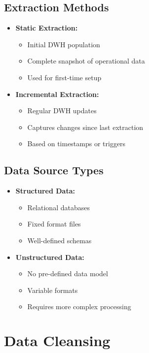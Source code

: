 \subsection{Extraction Methods}
\begin{itemize}
    \item \textbf{Static Extraction:}
        \begin{itemize}
            \item Initial DWH population
            \item Complete snapshot of operational data
            \item Used for first-time setup
        \end{itemize}
    \item \textbf{Incremental Extraction:}
        \begin{itemize}
            \item Regular DWH updates
            \item Captures changes since last extraction
            \item Based on timestamps or triggers
        \end{itemize}
\end{itemize}

\subsection{Data Source Types}
\begin{itemize}
    \item \textbf{Structured Data:}
        \begin{itemize}
            \item Relational databases
            \item Fixed format files
            \item Well-defined schemas
        \end{itemize}
    \item \textbf{Unstructured Data:}
        \begin{itemize}
            \item No pre-defined data model
            \item Variable formats
            \item Requires more complex processing
        \end{itemize}
\end{itemize}

\section{Data Cleansing}
